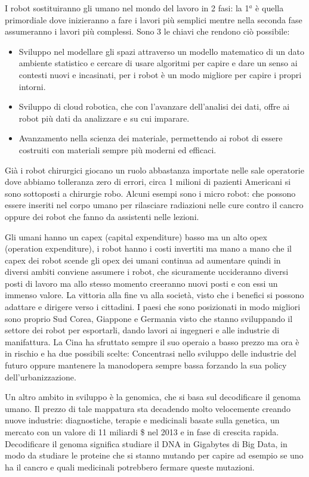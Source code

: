 \documentclass[a4page, 11pt]{article}
\begin{document}
I robot sostituiranno gli umano nel mondo del lavoro in 2 fasi: la 1$^a$ è
quella primordiale dove inizieranno a fare i lavori più semplici mentre
nella seconda fase assumeranno i lavori più complessi. Sono 3 le chiavi
che rendono ciò possibile:

\begin{itemize}
	 
	\item
	Sviluppo nel modellare gli spazi attraverso un modello matematico di
	un dato ambiente statistico e cercare di usare algoritmi per capire e
	dare un senso ai contesti nuovi e incasinati, per i robot è un modo
	migliore per capire i propri intorni.
	\item
	Sviluppo di cloud robotica, che con l'avanzare dell'analisi dei dati,
	offre ai robot più dati da analizzare e su cui imparare.
	\item
	Avanzamento nella scienza dei materiale, permettendo ai robot di
	essere costruiti con materiali sempre più moderni ed efficaci.
\end{itemize}

Già i robot chirurgici giocano un ruolo abbastanza importate nelle sale
operatorie dove abbiamo tolleranza zero di errori, circa 1 milioni di
pazienti Americani si sono sottoposti a chirurgie robo. Alcuni esempi
sono i micro robot: che possono essere inseriti nel corpo umano per
rilasciare radiazioni nelle cure contro il cancro oppure dei robot che
fanno da assistenti nelle lezioni.

Gli umani hanno un capex (capital expenditure) basso ma un alto opex
(operation expenditure), i robot hanno i costi invertiti ma mano a mano
che il capex dei robot scende gli opex dei umani continua ad aumentare
quindi in diversi ambiti conviene assumere i robot, che sicuramente
uccideranno diversi posti di lavoro ma allo stesso momento creeranno
nuovi posti e con essi un immenso valore. La vittoria alla fine va alla
società, visto che i benefici si possono adattare e dirigere verso i
cittadini. I paesi che sono posizionati in modo migliori sono proprio
Sud Corea, Giappone e Germania visto che stanno sviluppando il settore
dei robot per esportarli, dando lavori ai ingegneri e alle industrie di
manifattura. La Cina ha sfruttato sempre il suo operaio a basso prezzo
ma ora è in rischio e ha due possibili scelte: Concentrasi nello
sviluppo delle industrie del futuro oppure mantenere la manodopera
sempre bassa forzando la sua policy dell'urbanizzazione.

Un altro ambito in sviluppo è la genomica, che si basa sul decodificare
il genoma umano. Il prezzo di tale mappatura sta decadendo molto
velocemente creando nuove industrie: diagnostiche, terapie e medicinali
basate sulla genetica, un mercato con un valore di 11 miliardi \$ nel
2013 e in fase di crescita rapida. Decodificare il genoma significa
studiare il DNA in Gigabytes di Big Data, in modo da studiare le
proteine che si stanno mutando per capire ad esempio se uno ha il cancro
e quali medicinali potrebbero fermare queste mutazioni.
\end{document}
